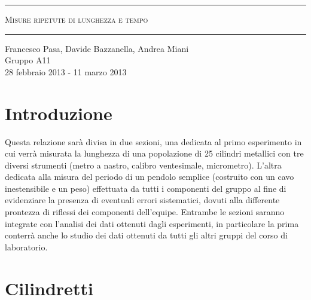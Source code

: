 \documentclass[12pt, twoside, a4paper]{article}
\begin{document}
\begin{titlepage}
\begin{center}
	\hrule \vspace{0.5cm}
     	\textsc{\LARGE Misure ripetute di lunghezza e tempo}
	\vspace{0.5cm} \hrule \vspace{2cm}
      	{\large Francesco Pasa, Davide Bazzanella, Andrea Miani\\
		Gruppo A11}\\
	\vspace{0.5cm}
      	{\large 28 febbraio 2013 - 11 marzo 2013}
	\vfill
	{\begin{abstract}
Misura della lunghezza di un gruppo di 25 cilindri di metallo e della durata del periodo di 	oscillazione di un pendolo semplice.
Analisi dei valori ottenuti dagli esperimenti del singolo gruppo e dei valori raccolti dagli esperimenti di tutti i gruppi di laboratorio.
	 \end{abstract}}
\end{center}
\end{titlepage}

\newpage

\vspace*{\fill}
\begin{center}
	\tableofcontents
\end{center}
\vspace*{\fill}

\newpage

\section{Introduzione}
Questa relazione sarà divisa in due sezioni, una dedicata al primo esperimento in cui verrà misurata la lunghezza di una popolazione di 25 cilindri metallici con tre diversi strumenti (metro a nastro, calibro ventesimale, micrometro). L'altra dedicata alla misura del periodo di un pendolo semplice (costruito con un cavo inestensibile e un peso) effettuata da tutti i componenti del gruppo al fine di evidenziare la presenza di eventuali errori sistematici, dovuti alla differente prontezza di riflessi dei componenti dell'equipe. Entrambe le sezioni saranno integrate con l'analisi dei dati ottenuti dagli esperimenti, in particolare la prima conterrà anche lo studio dei dati ottenuti da tutti gli altri gruppi del corso di laboratorio.

\section{Cilindretti}
\end{document}
